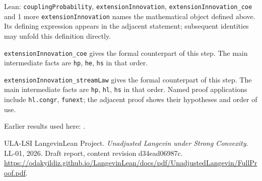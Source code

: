 \documentclass[11pt,a4paper]{article}
\begin{document}
\begin{leanbox}{Lean: \texttt{couplingProbability}, \texttt{extensionInnovation}, \texttt{extensionInnovation\_\allowbreak{}coe} and 1 more}
\texttt{extension\allowbreak{}Innovation} names the mathematical object defined above. Its defining expression appears in the adjacent statement; subsequent identities may unfold this definition directly.




\texttt{extension\allowbreak{}Innovation\_\allowbreak{}coe} gives the formal counterpart of this step. The main intermediate facts are \texttt{hp}, \texttt{he}, \texttt{hs} in that order.




\texttt{extension\allowbreak{}Innovation\_\allowbreak{}stream\allowbreak{}Law} gives the formal counterpart of this step. The main intermediate facts are \texttt{hp}, \texttt{hl}, \texttt{hs} in that order. Named proof applications include \texttt{hl.\allowbreak{}congr}, \texttt{funext}; the adjacent proof shows their hypotheses and order of use.
\end{leanbox}


Earlier results used here: \cite[Section~3.8.17]{LangevinLean2026ULASC}.

\begin{thebibliography}{ULA-LSI}
LangevinLean Project. \emph{Unadjusted Langevin under Strong Convexity}. LL-01, 2026. Draft report, content revision d34ead06987c. \url{https://odakyildiz.github.io/LangevinLean/docs/pdf/UnadjustedLangevin/FullProof.pdf}.
\end{thebibliography}
\end{document}
